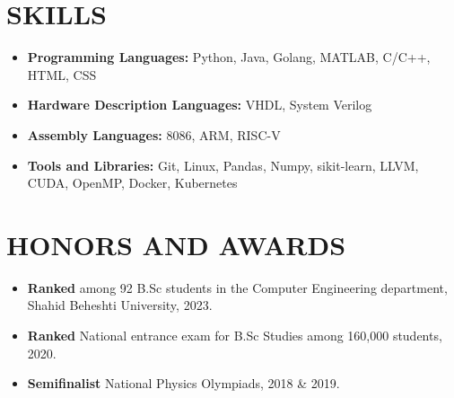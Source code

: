 \documentclass[11pt,a4paper,sans]{moderncv}        %
\begin{document}
\section{SKILLS}

\vspace{1pt}

\begin{itemize}

\item \textbf{Programming Languages: }Python, Java, Golang, MATLAB, C/C++, HTML, CSS

\vspace{1pt}

\item \textbf{Hardware Description Languages: }VHDL, System Verilog

\vspace{1pt}

\item \textbf{Assembly Languages: }8086, ARM, RISC-V 

\vspace{1pt} 


\item \textbf{Tools and Libraries: }Git, Linux, Pandas, Numpy, sikit-learn, LLVM, CUDA, OpenMP, Docker, Kubernetes

\end{itemize}

\section{HONORS AND AWARDS}

\vspace{4pt}

\begin{itemize}
\item \textbf{Ranked } among 92 B.Sc students in the Computer Engineering department, Shahid Beheshti University, 2023.
\end{itemize}

\begin{itemize}
\item \textbf{Ranked }{National entrance exam for B.Sc Studies among 160,000 students, 2020.}
\end{itemize}
\begin{itemize}
\item \textbf{Semifinalist}{{ National Physics Olympiads}, 2018 \& 2019.}
\end{itemize}
\end{document}
